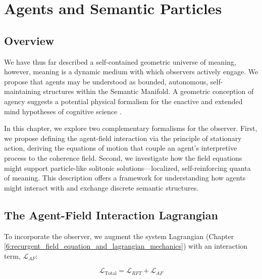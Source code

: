 \chapter{Agents and Semantic Particles}
\label{13:agents_and_semantic_particles}


\section{Overview}
\label{13.1:overview}

We have thus far described a self-contained geometric universe of meaning, however, meaning is a dynamic medium with which observers actively engage. We propose that agents may be understood as bounded, autonomous, self-maintaining structures within the Semantic Manifold. A geometric conception of agency suggests a potential physical formalism for the enactive and extended mind hypotheses of cognitive science \autocite{VarelaThompsonRosch1991, ClarkChalmers1998}.

In this chapter, we explore two complementary formalisms for the observer. First, we propose defining the agent-field interaction via the principle of stationary action, deriving the equations of motion that couple an agent's interpretive process to the coherence field. Second, we investigate how the field equations might support particle-like solitonic solutions—localized, self-reinforcing quanta of meaning. This description offers a framework for understanding how agents might interact with and exchange discrete semantic structures.


\section{The Agent-Field Interaction Lagrangian}
\label{13.2:the_agent_field_interaction_lagrangian}

To incorporate the observer, we augment the system Lagrangian (Chapter \ref{6:recurgent_field_equation_and_lagrangian_mechanics}) with an interaction term, \(\mathcal{L}_{AF}\):

\begin{equation}
\mathcal{L}_{\text{Total}} = \mathcal{L}_{RFT} + \mathcal{L}_{AF}
\end{equation}

